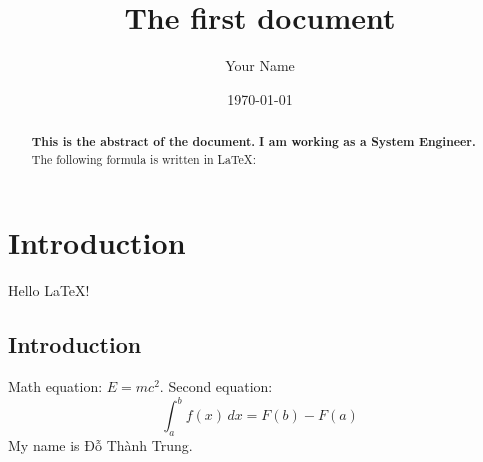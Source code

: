 \documentclass{article}
\title{The first document }
\author{Your Name}
\date{\today}
\begin{document}
	
	\maketitle
	\section{Introduction}
	Hello LaTeX!
	\subsection{Introduction}
	Math equation: $E = mc^2$.
	Second equation:
	$$ \int_{a}^{b} f(x) \,dx = F(b) - F(a) $$
	My name is Đỗ Thành Trung.
	\begin{abstract}
		\textbf{This is the abstract of the document.}
		\textbf{I am working as a System Engineer.}
		The following formula is written in LaTeX:
	\end{abstract}
\end{document}
